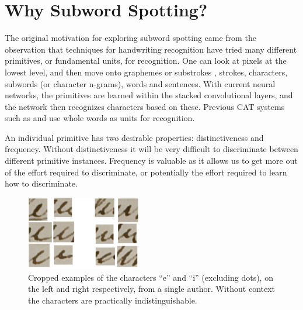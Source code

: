 \documentclass[ms,electronic,twosidetoc,letterpaper,chaptercenter,parttop,lof,lot]{byumsphd}
\begin{document}

\section{Why Subword Spotting?}

The original motivation for exploring subword spotting came from the observation that techniques for handwriting recognition have tried many different primitives, or fundamental units, for recognition. One can look at pixels at the lowest level, and then move onto graphemes or substrokes \cite{liang2012}, strokes, characters, subwords (or character n-grams), words and sentences. With current neural networks, the primitives are learned within the stacked convolutional layers, and the network then recognizes characters based on these. Previous CAT systems such as \cite{Clawson2014} and \cite{Zagoris2015} use whole words as units for recognition. 



An individual primitive has two desirable properties: distinctiveness and frequency. Without distinctiveness it will be very difficult to discriminate between different primitive instances. Frequency is valuable as it allows us to get more out of the effort required to discriminate, or potentially the effort required to learn how to discriminate.

\begin{figure}
    \centering
    \includegraphics[width=0.45\textwidth]{ei}
    \caption{Cropped examples of the characters ``e'' and ``i'' (excluding dots), on the left and right respectively, from a single author. Without context the characters are practically indistinguishable.}
    \label{fig:ei}
\end{figure}
\end{document}
